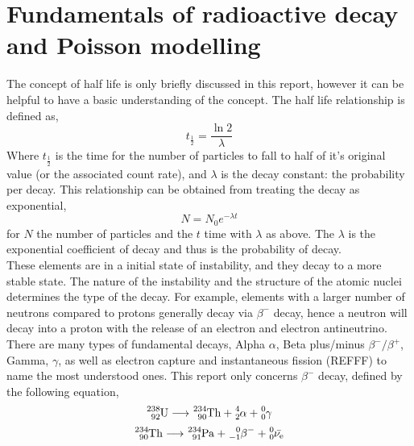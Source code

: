\documentclass[11pt]{article}
\begin{document}
    
    \section{Fundamentals of radioactive decay and Poisson modelling}
    The concept of half life is only briefly discussed in this report, however it can be helpful to have a basic understanding of the concept. The half life relationship is defined as,
    \begin{equation}
        t_{\frac{1}{2}} = \frac{\ln{2}}{\lambda}
    \end{equation}
    Where $ t_{\frac{1}{2}}$ is the time for the number of particles to fall to half of it's original value (or the associated count rate), and $\lambda$ is the decay constant: the probability per decay. This relationship can be obtained from treating the decay as exponential, 
    \begin{equation}
  N = N_0 e^{-\lambda t}
    \end{equation}
    for $N$ the number of particles and the $t$ time with $\lambda$ as above.  The $\lambda$ is the exponential coefficient of decay and thus is the probability of decay. 
   \\
   These elements are in a initial state of instability, and they decay to a more stable state. The nature of the instability and the structure of the atomic nuclei determines the type of the decay. For example, elements with a larger number of neutrons compared to protons generally decay via $\beta^{-}$ decay, hence a neutron will decay into a proton with the release of an electron and electron antineutrino. 
   There are many types of fundamental decays, Alpha $\alpha$, Beta plus/minus $\beta^{-}/\beta^{+}$, Gamma, $\gamma$, as well as electron capture and instantaneous fission (REFFF) to name the most understood ones. This report only concerns $\beta^{-}$ decay, defined by the following equation,
    \begin{equation}
    \ce{^{238}_{92}U} \longrightarrow \ce{^{234}_{90}Th} + \ce{^{4}_{2}\alpha} + \ce{^{0}_{0}\gamma}
\end{equation}
\begin{equation}
    \ce{^{234}_{90}Th} \longrightarrow \ce{^{234}_{91}Pa} + \ce{^{0}_{-1}\beta^{-}} + \ce{^{0}_{0}\bar{\nu_{e}}}
\end{equation}
\end{document}
